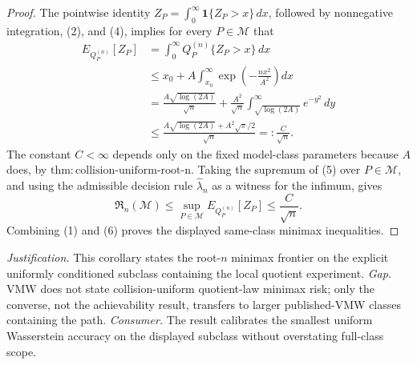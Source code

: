 \documentclass{article}
\begin{document}
\begin{proof}
The pointwise identity \(Z_P=\int_0^\infty\mathbf 1\{Z_P>x\}\,dx\), followed by nonnegative integration, (2), and (4), implies for every \(P\in\mathcal M\) that
\[
\begin{aligned}
E_{Q_P^{(n)}}[Z_P]
&=\int_0^\infty Q_P^{(n)}\{Z_P>x\}\,dx\\
&\le x_0+A\int_{x_0}^\infty
\exp\!\left(-\frac{nx^2}{A^2}\right)dx\\
&=\frac{A\sqrt{\log(2A)}}{\sqrt n}
+\frac{A^2}{\sqrt n}
\int_{\sqrt{\log(2A)}}^\infty e^{-y^2}\,dy\\
&\le \frac{A\sqrt{\log(2A)}+A^2\sqrt\pi/2}{\sqrt n}
=:\frac{C}{\sqrt n}.
\end{aligned}
\tag{5}
\]
The constant \(C<\infty\) depends only on the fixed model-class parameters because \(A\) does, by \(\mathrm{thm:collision\text{-}uniform\text{-}root\text{-}n}\).  Taking the supremum of (5) over \(P\in\mathcal M\), and using the admissible decision rule \(\widehat\lambda_n\) as a witness for the infimum, gives
\[
\mathfrak R_n(\mathcal M)
\le \sup_{P\in\mathcal M}E_{Q_P^{(n)}}[Z_P]
\le\frac{C}{\sqrt n}.
\tag{6}
\]
Combining (1) and (6) proves the displayed same-class minimax inequalities.
\end{proof}
\par\smallskip\noindent \textit{Justification.} This corollary states the root-\(n\) minimax frontier on the explicit uniformly conditioned subclass containing the local quotient experiment. \textit{Gap.} VMW does not state collision-uniform quotient-law minimax risk; only the converse, not the achievability result, transfers to larger published-VMW classes containing the path. \textit{Consumer.} The result calibrates the smallest uniform Wasserstein accuracy on the displayed subclass without overstating full-class scope.
\end{document}

